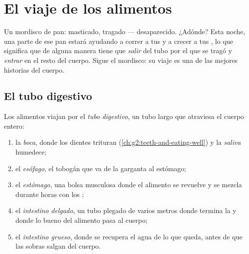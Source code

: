 \chapter{El viaje de los alimentos}\label{ch:g4:journey-of-food}

Un mordisco de pan: masticado, tragado --- desaparecido. ¿Adónde? Esta
noche, una parte de ese pan estará ayudando a correr a tus  y a
crecer a tus , lo que significa que de alguna manera tiene que
\emph{salir} del tubo por el que se tragó y \emph{entrar} en el resto
del cuerpo. Sigue el mordisco: su viaje es una de las mejores
historias del cuerpo.

\section{El tubo digestivo}

\begin{definition}\label{def:g4:journey-of-food:tract}
Los alimentos viajan por el \emph{tubo digestivo}, un tubo largo que atraviesa el cuerpo entero:
\begin{enumerate}
  \item la \emph{boca}, donde los dientes trituran
        (\cref{ch:g2:teeth-and-eating-well}) y la
        \emph{saliva} humedece;
  \item el \emph{esófago}, el tobogán que va de la
        garganta al estómago;
  \item el \emph{estómago}, una bolsa musculosa donde
        el alimento se revuelve y se mezcla durante horas con los ;
  \item el \emph{intestino delgado}, un tubo
        plegado de varios metros donde termina la  y donde lo
        bueno del alimento pasa al cuerpo;
  \item el \emph{intestino grueso}, donde se
        recupera el agua de lo que queda, antes de que las sobras
        salgan del cuerpo.
\end{enumerate}
\end{definition}


